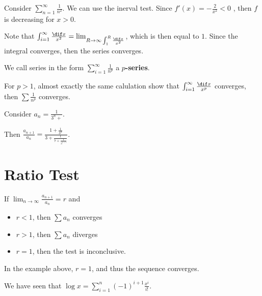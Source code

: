 \documentclass[11pt]{scrartcl}
\begin{document}
Consider $\sum_{n=1}^{\infty}\frac{1}{n^2}$. We can use the inerval test. Since $f'(x) = - \frac{2}{x^2} < 0$ , then $f$ is decreasing for $x > 0$.

Note that
$\int_{i=1}^{\infty} \frac{\dif x}{x^2} = \lim_{R\to \infty \int_1^R
  \frac{\dif x}{x^2}}$, which is then equal to $1$. Since the integral converges, then the series converges.

We call series in the form $\sum_{i=1}^{\infty}\frac{1}{n^{p}}$ a
\textbf{$p$-series}.

For $p>1$, almost exactly the same calulation show that $\int_{i=1}^{\infty} \frac{\dif x}{x^p}$ converges, then  $\sum \frac{1}{n^p}$ converges.

\begin{example}

Consider $a_n = \frac{1}{3^n+}$. 

Then $\frac{a_{n+1}}{a_n} = \frac{1+ \frac{1}{3^{n}}}{3 + \frac{1}{7+\frac{1}{3^{n+1}}}}$.

\end{example}

\section{Ratio Test}
\begin{theorem}
If $\lim_{n\to \infty} \frac{a_{n+1}}{a_n}=r$ and 
\begin{itemize}
\item $r< 1$, then $\sum a_n$ converges
\item $r> 1$, then $\sum a_n$ diverges
\item $r = 1$, then the test is inconclusive.
\end{itemize}

\end{theorem}

In the example above, $r=1$, and thus the sequence converges.

We have seen that $\log x = \sum_{i=1}^n (-1)^{i+1}\frac{x^i}{i!}$.
\end{document}
